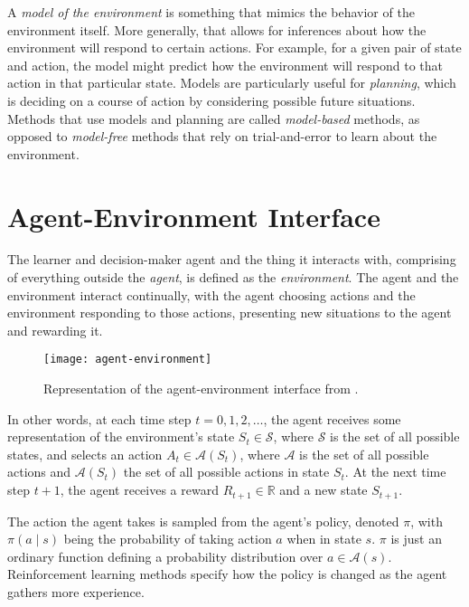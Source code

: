 A \textit{model of the environment} is something that mimics the behavior of the environment itself. More generally, that allows for inferences about how the environment will respond to certain actions. For example, for a given pair of state and action, the model might predict how the environment will respond to that action in that particular state. Models are particularly useful for \textit{planning}, which is deciding on a course of action by considering possible future situations. Methods that use models and planning are called \textit{model-based} methods, as opposed to \textit{model-free} methods that rely on trial-and-error to learn about the environment.

\section{Agent-Environment Interface}
The learner and decision-maker agent and the thing it interacts with, comprising of everything outside the \textit{agent}, is defined as the \textit{environment}. The agent and the environment interact continually, with the agent choosing actions and the environment responding to those actions, presenting new situations to the agent and rewarding it.

\begin{figure}[H]
    \texttt{[image: agent-environment]}
    \caption{Representation of the agent-environment interface from \cite{suttonbarto}.}
\end{figure}

In other words, at each time step $t = 0, 1, 2, \dots$, the agent receives some representation of the environment's state $S_t \in \mathcal{S}$, where $\mathcal{S}$ is the set of all possible states, and selects an action $A_t \in \mathcal{A}(S_t)$, where $\mathcal{A}$ is the set of all possible actions and $\mathcal{A}(S_t)$ the set of all possible actions in state $S_t$. At the next time step $t+1$, the agent receives a reward $R_{t+1} \in \mathbb{R}$ and a new state $S_{t+1}$. 

The action the agent takes is sampled from the agent's policy, denoted $\pi$, with $\pi(a \mid s)$ being the probability of taking action $a$ when in state $s$. $\pi$ is just an ordinary function defining a probability distribution over $a \in \mathcal{A}(s)$. Reinforcement learning methods specify how the policy is changed as the agent gathers more experience. 

